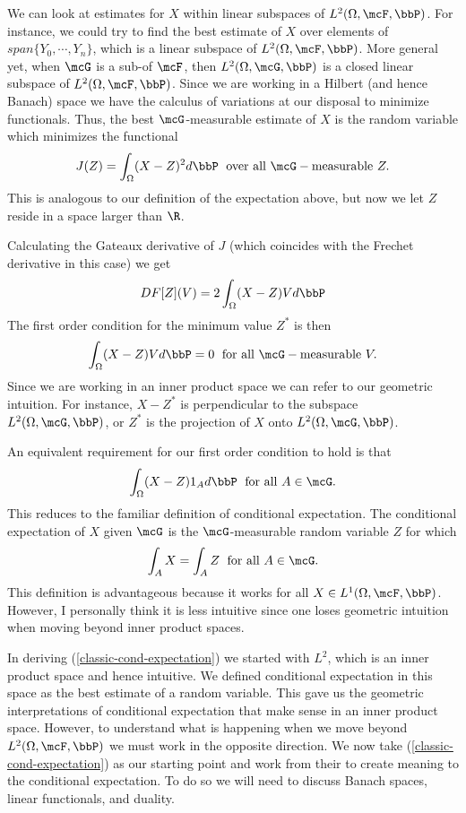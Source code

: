 \documentclass{report}
\begin{document}
We can look at estimates for $X$ within linear subspaces of $L^2(\Omega, \mcF, \bbP)$.  For instance, we could try to find the best estimate of $X$ over elements of $span \{Y_0, \cdots, Y_n\}$, which is a linear subspace of $L^2(\Omega, \mcF, \bbP)$.  
More general yet, when $\mcG$ is a sub-\sigalg of $\mcF$, then $L^2(\Omega, \mcG, \bbP)$ is a closed linear subspace of $L^2(\Omega, \mcF, \bbP)$.  Since we are working in a Hilbert (and hence Banach) space we have the calculus of variations at our disposal to minimize functionals.  Thus, the best $\mcG$-measurable estimate of $X$ is the random variable which minimizes the functional
\[
J(Z) = \int_\Omega (X - Z)^2 d \bbP \; \textmd{ over all } \mcG-\textmd{measurable } Z.
\]
This is analogous to our definition of the expectation above, but now we let $Z$ reside in a space larger than $\R$.

Calculating the Gateaux derivative of $J$ (which coincides with the Frechet derivative in this case) we get
\[
DF[Z](V) = 2 \int_\Omega (X-Z) V d \bbP
\]
The first order condition for the minimum value $Z^*$ is then
\[
\int_\Omega (X - Z) V d \bbP = 0 \; \textmd{ for all } \mcG-\textmd{measurable } V.
\]
Since we are working in an inner product space we can refer to our geometric intuition.  For instance, $X-Z^*$ is perpendicular to the subspace $L^2(\Omega, \mcG, \bbP)$, or $Z^*$ is the projection of $X$ onto $L^2(\Omega, \mcG, \bbP)$.

An equivalent requirement for our first order condition to hold is that
\[
\int_\Omega (X - Z) 1_A d \bbP \; \textmd{ for all } A \in \mcG.
\]
This reduces to the familiar definition of conditional expectation.  The conditional expectation of $X$ given $\mcG$ is the $\mcG$-measurable random variable $Z$ for which
\begin{equation}
\label{classic-cond-expectation}
\int_A X = \int_A Z \; \textmd{ for all } A \in \mcG.
\end{equation}
This definition is advantageous because it works for all $X \in L^1(\Omega, \mcF, \bbP)$.  However, I personally think it is less intuitive since one loses geometric intuition when moving beyond inner product spaces.

In deriving (\ref{classic-cond-expectation}) we started with $L^2$, which is an inner product space and hence intuitive.  We defined conditional expectation in this space as the best estimate of a random variable.  This gave us the geometric interpretations of conditional expectation that make sense in an inner product space.  However, to understand what is happening when we move beyond $L^2(\Omega, \mcF, \bbP)$ we must work in the opposite direction.  We now take (\ref{classic-cond-expectation}) as our starting point and work from their to create meaning to the conditional expectation.  To do so we will need to discuss Banach spaces, linear functionals, and duality.
\end{document}

